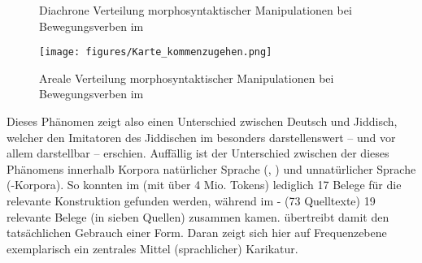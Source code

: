   \begin{figure}[b]
\fittable{
	\begin{tikzpicture}
		\begin{axis}[only marks, width=0.82\textwidth,height=0.2\textheight,
		legend style={at={(1,1)},xshift=+0.2cm, yshift=-0.32cm,anchor=north west,nodes=left},
			xtick={1700, 1725, 1750, 1775, 1800, 1825, 1850, 1875, 1900, 1925, 1950, 1975}, ytick=\empty,
			x tick label style={/pgf/number format/1000 sep=}, 
			y tick label style={/pgf/number format/1000 sep=},
			extra y tick style={grid=major,
				tick label style={, ,}},
				ymin=0.5,
				ymax=2.5,
			ylabel={Phänomenbelege},
			enlarge x limits=0.03]	
	
		



\addplot  [mark=*, black] table [x=jahr, y=entsprichtOJ]{figures/kommen_entsprichtOJ.txt};%
\addplot  [mark=square*, fill=white] table [x=jahr, y=nichtOJ] {figures/kommen_nichtOJ.txt};%

\addplot [mark=o,black] table [x=jahr, y=NO] {figures/kommen_no.txt};%
 

						\legend{\textit{kumen} + {\textit{zu}-Infinitiv}, sonst. Manipulation, keine Manipulation} %
		\end{axis}
	\end{tikzpicture}
}
	\caption{Diachrone Verteilung morphosyntaktischer Manipulationen bei Bewegungsverben im }
	\label{histokommenzugehen}	
\end{figure}

    


\begin{figure}[b]
\centering
\texttt{[image: figures/Karte\_kommenzugehen.png]}
		\caption{\label{Kartekommenzugehen} Areale Verteilung morphosyntaktischer Manipulationen bei Bewegungsverben im }
	\end{figure}


Dieses Phänomen zeigt also einen Unterschied zwischen Deutsch und Jiddisch, welcher den Imitatoren des Jiddischen im \hai{{\LiJi}} besonders darstellenswert – und vor allem darstellbar – erschien. Auffällig ist der Unterschied zwischen der  dieses Phänomens innerhalb Korpora natürlicher Sprache  (, ) und unnatürlicher Sprache (\hai{{\LiJi}}-Korpora). So konnten im  (mit über 4 Mio. Tokens) lediglich 17 Belege für die relevante Konstruktion gefunden werden, während im \hai{{\LiJi}}- (73 Quelltexte) 19 relevante Belege (in sieben Quellen) zusammen kamen. \hai{{\LiJi}} übertreibt damit den tatsächlichen Gebrauch einer Form. Daran zeigt sich hier auf Frequenzebene exemplarisch ein zentrales Mittel (sprachlicher) Karikatur. 


